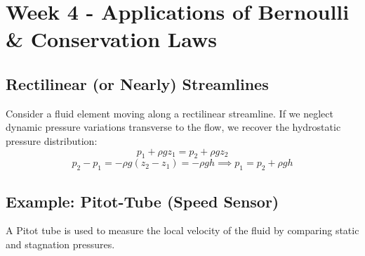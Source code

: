\section{Week 4 - Applications of Bernoulli \& Conservation Laws}

\subsection{Rectilinear (or Nearly) Streamlines}

Consider a fluid element moving along a rectilinear streamline. If we neglect dynamic pressure variations transverse to the flow, we recover the hydrostatic pressure distribution:
\begin{equation*}
    p_{1} + \rho g z_{1} = p_{2} + \rho g z_{2}
\end{equation*}
\begin{equation}
    p_{2} - p_{1} = -\rho g (z_{2} - z_{1}) = -\rho g h \implies p_{1} = p_{2} + \rho g h
\end{equation}

\subsection{Example: Pitot-Tube (Speed Sensor)}

A Pitot tube is used to measure the local velocity of the fluid by comparing static and stagnation pressures.

\begin{center}
\end{center}

